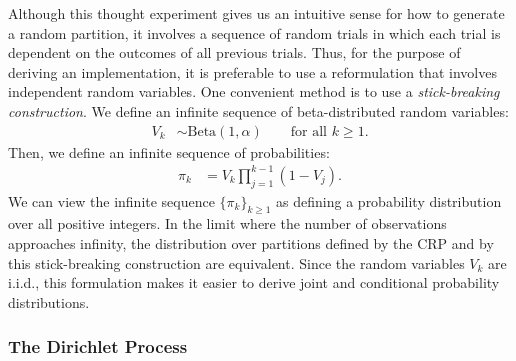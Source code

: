 \documentclass{article}
\begin{document}
Although this thought experiment gives us an intuitive sense for how to generate a random partition, it involves a sequence of random trials in which each trial is dependent on the outcomes of all previous trials.
Thus, for the purpose of deriving an implementation, it is preferable to use a reformulation that involves independent random variables.
One convenient method is to use a \emph{stick-breaking construction}.
We define an infinite sequence of beta-distributed random variables:
\begin{align}
V_k &\sim \text{Beta}(1, \alpha) \qquad \text{for all $k \geq 1$}.
\end{align}
Then, we define an infinite sequence of probabilities:
\begin{align}
\pi_k &= V_k \prod_{j=1}^{k-1} (1-V_j).
\label{eq:pi_crp}
\end{align}
We can view the infinite sequence $\{\pi_k\}_{k \geq 1}$ as defining a probability distribution over all positive integers.
In the limit where the number of observations approaches infinity, the distribution over partitions defined by the CRP and by this stick-breaking construction are equivalent.
Since the random variables $V_k$ are i.i.d., this formulation makes it easier to derive joint and conditional probability distributions.

\subsubsection{The Dirichlet Process}
\end{document}
